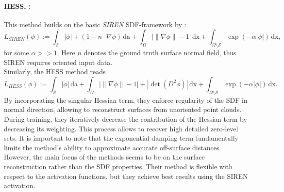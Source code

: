 \documentclass[draft,12pt,openany]{book}
\def\S{\mathcal{S}}
\theoremstyle{plainnormal}
\theoremstyle{remark}
\begin{document}
\paragraph{HESS, \cite{wang2023neuralsingularhessianimplicitneuralrepresentation}:} This method builds on the basic \emph{SIREN} SDF-framework by \cite{sitzmann2020implicitneuralrepresentationsperiodic}:
$$
L_{SIREN}(\phi) := \int_\S |\phi| + (1-n\cdot\nabla \phi) \,\mathrm{da} + \int_\Omega \big|\|\nabla \phi\| - 1\big| \,\mathrm{dx} + \int_{\Omega\setminus\S} \exp(-\alpha |\phi|) \,\mathrm{dx},
$$
for some $\alpha >> 1$. Here $n$ denotes the ground truth surface normal field, thus SIREN requires oriented input data.\\
Similarly, the HESS method reads
$$L_{HESS}(\phi) := \int_\S |\phi| \,\mathrm{da} + \int_\Omega \big|\|\nabla \phi\| - 1\big|  + |\det(D^2\phi)| \,\mathrm{dx} + \int_{\Omega\setminus\S} \exp(-\alpha |\phi|) \,\mathrm{dx}. $$
By incorporating the singular Hessian term, they enforce regularity of the SDF in normal direction, allowing to reconstruct surfaces from unoriented point clouds. \\
During training, they iteratively decrease the contribution of the Hessian term by decreasing its weighting. This process allows to recover high detailed zero-level sets. It is important to note that the exponential damping term fundamentally limits the method’s ability to approximate accurate off-surface distances. However, the main focus of the methods seems to be on the surface reconstruction rather than the SDF properties. Their method is flexible with respect to the activation functions, but they achieve best results using the SIREN activation. 
\end{document}
